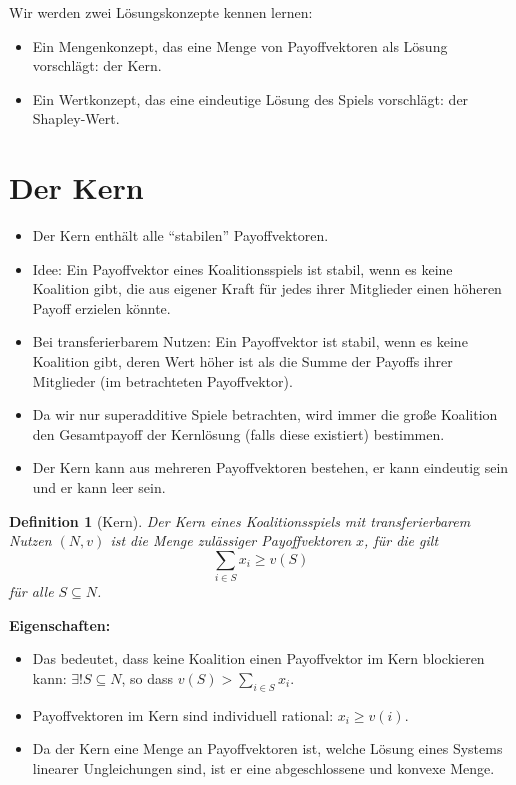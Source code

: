 \documentclass[12pt]{extreport} %
\theoremstyle{named}
\theoremstyle{itshape}
\newtheorem*{definition}{Definition}
\theoremstyle{normal}
\begin{document}
Wir werden zwei Lösungskonzepte kennen lernen:
\begin{itemize}
	\item Ein Mengenkonzept, das eine Menge von Payoffvektoren als Lösung vorschlägt: der Kern.
	\item Ein Wertkonzept, das eine eindeutige Lösung des Spiels vorschlägt: der Shapley-Wert.
\end{itemize}

\section{Der Kern} 

\begin{itemize}
	\item Der Kern enthält alle \enquote{stabilen} Payoffvektoren.
	\item Idee: Ein Payoffvektor eines Koalitionsspiels ist stabil, wenn es keine Koalition gibt, die aus eigener Kraft für jedes ihrer Mitglieder einen höheren Payoff erzielen könnte.
	\item Bei transferierbarem Nutzen: Ein Payoffvektor ist stabil, wenn es keine Koalition gibt, deren Wert höher ist als die Summe der Payoffs ihrer Mitglieder (im betrachteten Payoffvektor).
	\item Da wir nur superadditive Spiele betrachten, wird immer die große Koalition den Gesamtpayoff der Kernlösung (falls diese existiert) bestimmen.
	\item Der Kern kann aus mehreren Payoffvektoren bestehen, er kann eindeutig sein und er kann leer sein.
\end{itemize}

\begin{definition}[Kern]
	Der Kern eines Koalitionsspiels mit transferierbarem Nutzen $(N, v)$ ist die Menge zulässiger Payoffvektoren $x$, für die gilt
	$$ \sum_{i \in S} x_i \geq v(S) $$
	für alle $S \subseteq N$.
\end{definition}

\textbf{Eigenschaften:}
\begin{itemize}
	\item Das bedeutet, dass keine Koalition einen Payoffvektor im Kern blockieren kann: $\exists! S \subseteq N$, so dass $v(S) > \sum_{i \in S} x_i$.
	\item Payoffvektoren im Kern sind individuell rational: $x_i \geq v(i)$.
	\item Da der Kern eine Menge an Payoffvektoren ist, welche Lösung eines Systems linearer Ungleichungen sind, ist er eine abgeschlossene und konvexe Menge.
\end{itemize}
\end{document}
